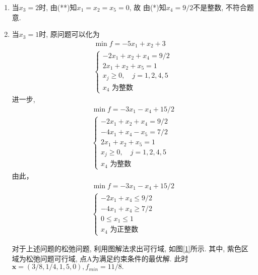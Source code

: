 \documentclass[11pt,AutoFakeBold]{article}
\begin{document}
\begin{enumerate}
        \item 当$x_3=2$时, 由(**)知$x_1=x_2=x_5=0$, 故
        由(*)知$x_4=9/2$不是整数, 不符合题意.
        \item 当$x_3=1$时, 原问题可以化为
        $$\begin{array}{l}
        \min f=-5 x_{1}+x_{2}+3 \\
        \left\{\begin{array}{l}
        -2 x_{1}+x_{2}+x_{4}=9/2\\
        2 x_{1}+x_{2}+x_{5}=1\\
        x_{j} \geqslant 0, \quad j=1,2, 4, 5 \\
        x_{4} \text { 为整数 }
        \end{array}\right.\end{array}$$
        进一步, 
        $$\begin{array}{l}
        \min f=-3 x_{1}-x_{4}+15/2 \\
        \left\{\begin{array}{l}
        -2 x_{1}+x_{2}+x_{4}=9/2\\
        -4 x_{1}+x_{4}-x_5=7/2\\
        2 x_{1}+x_{2}+x_{5}=1\\
        x_{j} \geqslant 0, \quad j=1,2, 4, 5 \\
        x_{4} \text { 为整数 }
        \end{array}\right.\end{array}$$
        由此，
        $$\begin{array}{l}
        \min f=-3 x_{1}-x_{4}+15/2 \\
        \left\{\begin{array}{l}
        -2 x_{1}+x_{4} \leqslant 9/2\\
        -4 x_{1}+x_{4}\geqslant 7/2\\
        0\leqslant x_{1}\leqslant 1\\
        x_{4} \text { 为正整数 }
        \end{array}\right.\end{array}$$

        对于上述问题的松弛问题, 利用图解法求出可行域, 如图\ref{1}所示.
        其中, 紫色区域为松弛问题可行域, 点A为满足约束条件的最优解. 此时
        $\mathbf{x}=(3/8,1/4 ,1,5,0), f_{min}=11/8.$ 


\end{enumerate}
\end{document}
